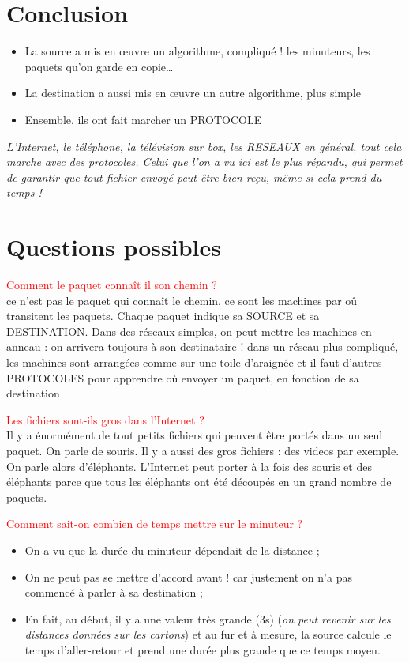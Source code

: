 \documentclass[10pt,a4paper]{article}
\newcommand{\question}[2]{\noindent \textcolor{red}{#1}\\ #2}
\begin{document}
\section*{Conclusion}
\begin{itemize}
  \item La source a mis en œuvre un algorithme, compliqué ! les minuteurs, les
    paquets qu’on garde en copie…
  \item La destination a aussi mis en œuvre un autre algorithme, plus simple
  \item Ensemble, ils ont fait marcher un PROTOCOLE
\end{itemize}


\emph{L’Internet, le téléphone, la télévision sur box, les RESEAUX en général, tout
cela marche avec des protocoles. Celui que l’on a vu ici est le plus répandu,
qui permet de garantir que tout fichier envoyé peut être bien reçu, même si
cela prend du temps !}

\section*{Questions possibles}

\question{Comment le paquet connaît il son chemin ?}{ce n’est pas le paquet qui
  connaît le chemin, ce sont les machines par oû transitent les paquets. Chaque
  paquet indique sa SOURCE et sa DESTINATION. Dans des réseaux simples, on peut
  mettre les machines en anneau : on arrivera toujours à son destinataire !
  dans un réseau plus compliqué, les machines sont arrangées comme sur une
  toile d’araignée et il faut d’autres PROTOCOLES pour apprendre où envoyer un
paquet, en fonction de sa destination }

\question{Les fichiers sont-ils gros dans l’Internet ?}{Il y a énormément de
  tout petits fichiers qui peuvent être portés dans un seul paquet. On parle de
  souris. Il y a aussi des gros fichiers : des videos par exemple. On parle
  alors d’éléphants. L’Internet peut porter à la fois des souris et des
  éléphants parce que tous les éléphants ont été découpés en un grand nombre de
paquets.}

\question{Comment sait-on combien de temps mettre sur le minuteur ?}{
  \begin{itemize}
    \item On a vu que la durée du minuteur dépendait de la distance ;
    \item On ne peut pas se mettre d’accord avant ! car justement on n’a pas
      commencé à parler à sa destination ;
    \item En fait, au début, il y a une valeur très grande (3s) (\emph{on peut
      revenir sur les distances données sur les cartons}) et au fur et à mesure,
      la source calcule le temps d’aller-retour et prend une durée plus grande
      que ce temps moyen.
  \end{itemize}
  }
\end{document}
